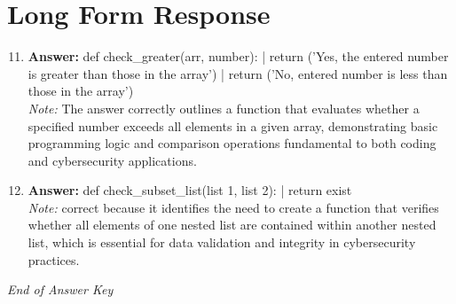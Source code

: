 \documentclass[12pt]{article}
\begin{document}
\section*{Long Form Response}
\begin{enumerate}[label=\arabic*.]
\setcounter{enumi}{10}
\item \textbf{Answer:} def check\_greater(arr, number): | return ('Yes, the entered number is greater than those in the array') | return ('No, entered number is less than those in the array')
\\ \textit{Note:} The answer correctly outlines a function that evaluates whether a specified number exceeds all elements in a given array, demonstrating basic programming logic and comparison operations fundamental to both coding and cybersecurity applications.
\item \textbf{Answer:} def check\_subset\_list(list 1, list 2): | return exist
\\ \textit{Note:} correct because it identifies the need to create a function that verifies whether all elements of one nested list are contained within another nested list, which is essential for data validation and integrity in cybersecurity practices.
\end{enumerate}

\vfill
\noindent\textit{End of Answer Key}
\end{document}
